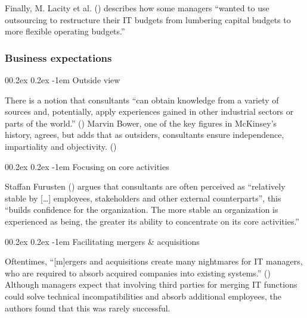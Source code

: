 \documentclass[
  man,floatsintext]{apa6}
\makeatletter
\let\oldparagraph\paragraph
\renewcommand{\paragraph}[1]{\oldparagraph{#1}\mbox{}}
\renewcommand{\paragraph}{\@startsection{paragraph}{4}{\parindent}%
  {0\baselineskip \@plus 0.2ex \@minus 0.2ex}%
  {-1em}%
  {\normalfont\normalsize\bfseries\itshape\typesectitle}}
\makeatother
\begin{document}
Finally, M. Lacity et al. () describes how some managers ``wanted to use outsourcing to restructure their IT budgets from lumbering capital budgets to more flexible operating budgets.''

\subsubsection{Business expectations}\label{business-expectations}

\paragraph{Outside view}\label{outside-view}

There is a notion that consultants ``can obtain knowledge from a variety of sources and, potentially, apply experiences gained in other industrial sectors or parts of the world.'' () Marvin Bower, one of the key figures in McKinsey's history, agrees, but adds that as outsiders, consultants ensure independence, impartiality and objectivity. ()

\paragraph{Focusing on core activities}\label{focusing-on-core-activities}

Staffan Furusten () argues that consultants are often perceived as ``relatively stable by {[}\ldots{]} employees, stakeholders and other external counterparts'', this ``builds confidence for the organization. The more stable an organization is experienced as being, the greater its ability to concentrate on its core activities.''

\paragraph{Facilitating mergers \& acquisitions}\label{facilitating-mergers-acquisitions}

Oftentimes, ``{[}m{]}ergers and acquisitions create many nightmares for IT managers, who are required to absorb acquired companies into existing systems.'' () Although managers expect that involving third parties for merging IT functions could solve technical incompatibilities and absorb additional employees, the authors found that this was rarely successful.
\end{document}
